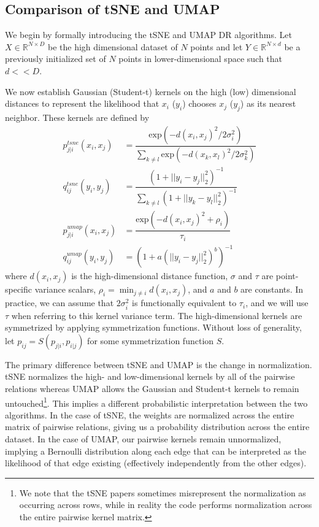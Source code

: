 \documentclass{article}
\theoremstyle{definition}
\begin{document}
\begin{multicols}{2}
\section{Comparison of tSNE and UMAP} \label{comparison}
We begin by formally introducing the tSNE and UMAP DR algorithms. Let $X \in \mathbb{R}^{N \times D}$ be the high dimensional dataset of $N$ points and let $Y
\in \mathbb{R}^{N \times d}$ be a previously initialized set of $N$ points in lower-dimensional space such that $d << D$. 

We now establish Gaussian (Student-t) kernels on the high (low) dimensional distances to represent the likelihood that $x_i$ ($y_i$) chooses
$x_j$ ($y_j$) as
its nearest neighbor. These kernels are defined by
\begin{align}
    p^{tsne}_{j|i}(x_i, x_j) &= \dfrac{\text{exp}(-d(x_i, x_j)^2 / 2 \sigma_i^2)}{\sum_{k \neq l} \text{exp}(-d(x_k, x_l)^2 / 2 \sigma_k^2)} \\[0.5ex]
    q^{tsne}_{ij}(y_i, y_j) &= \dfrac{(1 + ||y_i - y_j||^2_2)^{-1}}{\sum_{k \neq l} (1 + ||y_k - y_l||^2_2)^{-1}} \\[1.5ex]
    p^{umap}_{j|i}(x_i, x_j) &= \dfrac{\text{exp} (-d(x_i, x_j)^2 + \rho_{i})}{\tau_i} \\[0.3ex]
    q^{umap}_{ij}(y_i, y_j) &= \left( 1 + a(||y_i - y_j||^2_2)^b \right) ^{-1}
\end{align}
where $d(x_i, x_j)$ is the high-dimensional distance function, $\sigma$ and $\tau$ are point-specific variance scalars, $\rho_i = \min_{j \neq i} d(x_i, x_j)$,
and $a$ and $b$ are constants. In practice, we can assume that $2 \sigma_i^2$ is functionally equivalent to $\tau_i$, and we will use $\tau$ when referring to
this kernel variance term. The high-dimensional kernels are symmetrized by applying symmetrization functions. Without loss of generality, let $p_{ij}
= S(p_{j|i}, p_{i|j})$ for some symmetrization function $S$.

The primary difference between tSNE and UMAP is the change in normalization. tSNE normalizes the high- and low-dimensional kernels by all of the pairwise
relations whereas UMAP allows the Gaussian and Student-t kernels to remain untouched\footnote{We note that the tSNE papers sometimes misrepresent the normalization as
occurring across rows, while in reality the code performs normalization across the entire pairwise kernel matrix.}. This implies a different probabilistic
interpretation between the two algorithms. In the case of tSNE, the weights are normalized across the entire matrix of pairwise relations, giving us 
a probability distribution across the entire dataset. In the case of UMAP, our pairwise kernels remain unnormalized, implying a Bernoulli distribution along
each edge that can be interpreted as the likelihood of that edge existing (effectively independently from the other edges).


\end{multicols}
\end{document}
